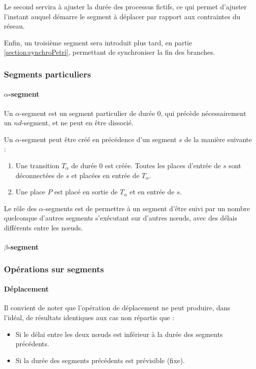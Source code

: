 Le second servira à ajuster la durée des processus fictifs, ce qui permet d'ajuster l'instant auquel démarre le segment à déplacer par rapport aux contraintes du réseau.

Enfin, un troisième segment sera introduit plus tard, en partie \ref{section:synchroPetri}, permettant de synchroniser la fin des branches.

\subsubsection{Segments particuliers}
\paragraph{$\alpha$-segment}
\begin{mydef}
Un $\alpha$-segment est un segment particulier de durée $0$, qui précède nécessairement un $nd$-segment, et ne peut en être dissocié.
\end{mydef}
Un $\alpha$-segment peut être créé en précédence d'un segment $s$ de la manière suivante : 
\begin{enumerate}
\item Une transition $T_\alpha$ de durée 0 est créée. Toutes les places d'entrée de $s$ sont déconnectées de $s$ et placées en entrée de $T_\alpha$.
\item Une place $P$ est placé en sortie de $T_\alpha$ et en entrée de $s$. 
\end{enumerate}

Le rôle des $\alpha$-segments est de permettre à un segment d'être suivi par un nombre quelconque d'autres segments s'exécutant sur d'autres nœuds, avec des délais différents entre les nœuds.

\paragraph{$\beta$-segment}

\subsubsection{Opérations sur segments}
\paragraph{Déplacement}

Il convient de noter que l'opération de déplacement ne peut produire, dans l'idéal, de résultats identiques aux cas non répartis que : 
\begin{itemize}
\item Si le délai entre les deux nœuds est inférieur à la durée des segments précédents.
\item Si la durée des segments précédents est prévisible (fixe).
\end{itemize} 

